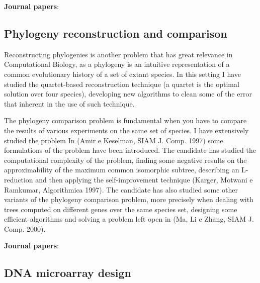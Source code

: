 \documentclass[11pt,a4paper,roman]{moderncv}
\begin{document}
\textbf{Journal
papers}:~\cite{baaijensComputationalGraphPangenomics2022,DBLP:journals/ipl/BonizzoniVDP10,DBLP:journals/tcbb/BonizzoniVDFRV07,DBLP:journals/informs/JustV04,DBLP:journals/dam/BonizzoniVM01,DBLP:journals/tcs/BonizzoniV01}

\subsection{Phylogeny reconstruction and
comparison}\label{phylogeny-reconstruction-and-comparison}

Reconstructing phylogenies is another problem that has great relevance
in Computational Biology, as a phylogeny is an intuitive representation
of a common evolutionary history of a set of extant species. In this
setting I have studied the quartet-based reconstruction technique (a
quartet is the optimal solution over four species), developing new
algorithms to clean some of the error that inherent in the use of such
technique.

The phylogeny comparison problem is fundamental when you have to compare
the results of various experiments on the same set of species. I have
extensively studied the problem In (Amir e Keselman, SIAM J. Comp. 1997)
some formulations of the problem have been introduced. The candidate has
studied the computational complexity of the problem, finding some
negative results on the approximability of the maximum common isomorphic
subtree, describing an L-reduction and then applying the
self-improvement technique (Karger, Motwani e Ramkumar, Algorithmica
1997). The candidate has also studied some other variants of the
phylogeny comparison problem, more precisely when dealing with trees
computed on different genes over the same species set, designing some
efficient algorithms and solving a problem left open in (Ma, Li e Zhang,
SIAM J. Comp. 2000).

\textbf{Journal
papers}:~\cite{DBLP:journals/jcb/AliCLVP21,DBLP:journals/bioinformatics/CiccolellaRGPSB21,DBLP:journals/bioinformatics/CiccolellaBDBPV21,DBLP:journals/bmcbi/CiccolellaGPVHB20,DBLP:journals/tcbb/BonizzoniCVS19,DBLP:journals/tcs/BonizzoniCVRT17,DBLP:journals/fuin/BonizzoniCVRT17,bonizzoniExplainingEvolutionConstrained2014,DBLP:journals/tcs/BonizzoniVD05,DBLP:journals/bioinformatics/VedovaW02,DBLP:journals/ijfcs/BonizzoniVM00}

\subsection{DNA microarray design}\label{dna-microarray-design}
\end{document}
